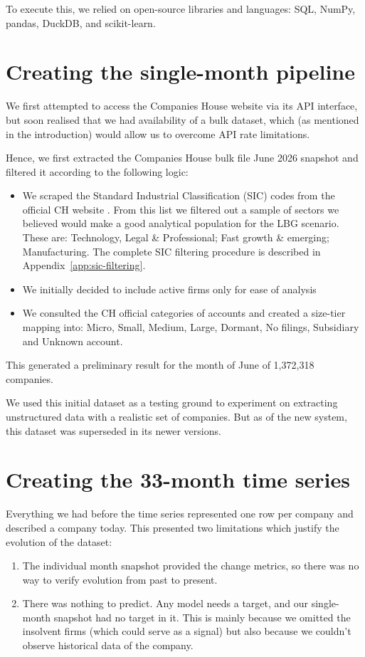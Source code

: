 \documentclass[ %
                    author={Daniel Page},
                supervisor={Dr. Andrew Calway},
                    degree={MSc},
                     title={Some Structural Guidelines for Data Science MSc Theses, Including Those With Long Titles that Run Across Multiple Lines on the Front Page},
                  subtitle={And those including an optional subtitle too, for good measure},
                      type={},
                      year={2021}]{dissertation}
\begin{document}
To execute this, we relied on open-source libraries and languages: SQL, NumPy, pandas, DuckDB, and scikit-learn.

\section{Creating the single-month pipeline}
We first attempted to access the Companies House website via its API interface, but soon realised that we had availability of a bulk dataset, which (as mentioned in the introduction) would allow us to overcome API rate limitations. 

Hence, we first extracted the Companies House bulk file June 2026 snapshot and filtered it according to the following logic:
\begin{itemize}
    \item We scraped the Standard Industrial Classification (SIC) codes from the official CH website \cite{companieshouse_sic}. From this list we filtered out a sample of sectors we believed would make a good analytical population for the LBG scenario. These are: Technology, Legal \& Professional; Fast growth \& emerging; Manufacturing. The complete SIC filtering procedure is described in Appendix~\ref{app:sic-filtering}.
    \item We initially decided to include active firms only for ease of analysis
    \item We consulted the CH official categories of accounts \cite{companieshouse_accounts_2026} and created a size-tier mapping into: Micro, Small, Medium, Large, Dormant, No filings, Subsidiary and Unknown account.
\end{itemize}

This generated a preliminary result for the month of June of 1,372,318 companies.

We used this initial dataset as a testing ground to experiment on extracting unstructured data with a realistic set of companies. But as of the new system, this dataset was superseded in its newer versions.

\section{Creating the 33-month time series}
Everything we had before the time series represented one row per company and described a company today. This presented two limitations which justify the evolution of the dataset:

\begin{enumerate}
    \item The individual month snapshot provided the change metrics, so there was no way to verify evolution from past to present.
    \item There was nothing to predict. Any model needs a target, and our single-month snapshot had no target in it. This is mainly because we omitted the insolvent firms (which could serve as a signal) but also because we couldn't observe historical data of the company.
\end{enumerate}
\end{document}
